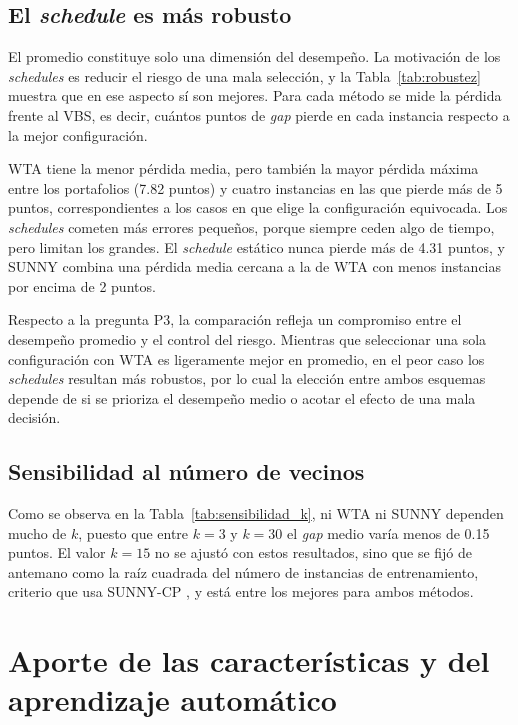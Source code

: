 \subsection{El \textit{schedule} es más robusto}

El promedio constituye solo una dimensión del desempeño. La motivación de los
\textit{schedules} es reducir el riesgo de una mala selección, y la
Tabla~\ref{tab:robustez} muestra que en ese aspecto sí son mejores. Para cada
método se mide la pérdida frente al VBS, es decir, cuántos puntos de
\textit{gap} pierde en cada instancia respecto a la mejor configuración.



WTA tiene la menor pérdida media, pero también la mayor pérdida máxima entre
los portafolios (7.82 puntos) y cuatro instancias en las que pierde más de 5
puntos, correspondientes a los casos en que elige la configuración equivocada.
Los \textit{schedules} cometen más errores pequeños, porque siempre ceden algo
de tiempo, pero limitan los grandes. El \textit{schedule} estático nunca pierde
más de 4.31 puntos, y SUNNY combina una pérdida media cercana a la de WTA con
menos instancias por encima de 2 puntos.

Respecto a la pregunta P3, la comparación refleja un compromiso entre el
desempeño promedio y el control del riesgo. Mientras que seleccionar una sola
configuración con WTA es ligeramente mejor en promedio, en el peor caso los
\textit{schedules} resultan más robustos, por lo cual la elección entre ambos
esquemas depende de si se prioriza el desempeño medio o acotar el efecto de una
mala decisión.

\subsection{Sensibilidad al número de vecinos}

Como se observa en la Tabla~\ref{tab:sensibilidad_k}, ni WTA ni SUNNY dependen
mucho de $k$, puesto que entre $k = 3$ y $k = 30$ el \textit{gap} medio varía
menos de 0.15 puntos. El valor $k = 15$ no se ajustó con estos resultados,
sino que se fijó de antemano como la raíz cuadrada del número de instancias
de entrenamiento, criterio que usa SUNNY-CP \citep{amadini2015sunnycp}, y
está entre los mejores para ambos métodos.



\section{Aporte de las características y del aprendizaje automático}
\label{sec:res_prediccion}

